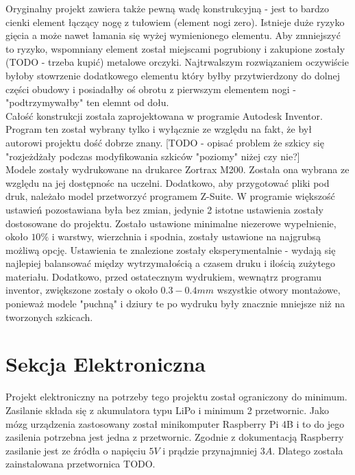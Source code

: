 \documentclass[a4paper,13pt]{article}
\begin{document}
Oryginalny projekt zawiera także pewną wadę konstrukcyjną - jest to bardzo cienki element łączący nogę z tułowiem (element nogi zero). Istnieje duże ryzyko gięcia a może nawet łamania się wyżej wymienionego elementu. Aby zmniejszyć to ryzyko, wspomniany element został miejscami pogrubiony i zakupione zostały (TODO - trzeba kupić) metalowe orczyki. Najtrwalszym rozwiązaniem oczywiście byłoby stowrzenie dodatkowego elementu który byłby przytwierdzony do dolnej części obudowy i posiadałby oś obrotu z pierwszym elementem nogi -  "podtrzymywałby" ten elemnt od dołu.\\

Całość konstrukcji została zaprojektowana w programie Autodesk Inventor. Program ten został wybrany tylko i wyłącznie ze względu na fakt, że był autorowi projektu dość dobrze znany. [TODO - opisać problem że szkicy się "rozjeżdżały podczas modyfikowania szkiców "poziomy" niżej czy nie?]\\

Modele zostały wydrukowane na drukarce Zortrax M200. Została ona wybrana ze względu na jej dostępnośc na uczelni. Dodatkowo, aby przygotować pliki pod druk, należało model przetworzyć programem Z-Suite. W programie większość ustawień pozostawiana była bez zmian, jedynie 2 istotne ustawienia zostały dostosowane do projektu. Zostało ustawione minimalne niezerowe wypełnienie, około $10\%$ i warstwy, wierzchnia i spodnia, zostały ustawione na najgrubsą możliwą opcję. Ustawienia te znalezione zostały eksperymentalnie - wydają się najlepiej balansować między wytrzymałością a czasem druku i ilością zużytego materiału. Dodatkowo, przed ostatecznym wydrukiem, wewnątrz programu inventor, zwiększone zostały o około $0.3-0.4 mm$ wszystkie otwory montażowe, ponieważ modele "puchną" i dziury te po wydruku były znacznie mniejsze niż na tworzonych szkicach.\\

\section{Sekcja Elektroniczna}
Projekt elektroniczny na potrzeby tego projektu został ograniczony do minimum. Zasilanie składa się z akumulatora typu LiPo i minimum 2 przetwornic. Jako mózg urządzenia zastosowany został minikomputer Raspberry Pi 4B i to do jego zasilenia potrzebna jest jedna z przetwornic. Zgodnie z dokumentacją Raspberry zasilanie jest ze źródła o napięciu $5V$ i prądzie przynajmniej $3A$.\cite{RPI_power_sup} Dlatego została zainstalowana przetwornica TODO.\\
\end{document}
